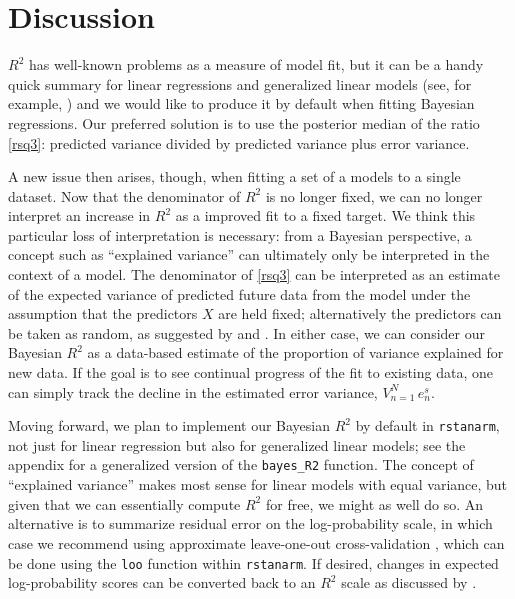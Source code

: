 \documentclass[11pt]{article}
\begin{document}
\section{Discussion}
$R^2$ has well-known problems as a measure of model fit, but it can be a handy
quick summary for linear regressions and generalized linear models (see, for
example, \cite{HuPaltaShao2006}) and we would like to produce it by default
when fitting Bayesian regressions.  Our preferred solution is to use the
posterior median of the ratio \eqref{rsq3}:  predicted variance divided by
predicted variance plus error variance.

A new issue then arises, though, when fitting a set of a models to a single
dataset.  Now that the denominator of $R^2$ is no longer fixed, we can no longer
interpret an increase in $R^2$ as a improved fit to a fixed target.  We think
this particular loss of interpretation is necessary:  from a Bayesian
perspective, a concept such as ``explained variance'' can ultimately only be
interpreted in the context of a model.  The denominator of \eqref{rsq3} can be
interpreted as an estimate of the expected variance of predicted future data
from the model under the assumption that the predictors $X$ are held fixed;
alternatively the predictors can be taken as random, as suggested by
\cite{Helland1987} and \cite{Tjur2009}.  In either case, we can consider our
Bayesian $R^2$ as a data-based estimate of the proportion of variance explained
for new data. If the goal is to see continual progress of the fit to existing
data, one can simply track the decline in the estimated error variance,
$V_{n=1}^N \,e_n^s$.

Moving forward, we plan to implement our Bayesian $R^2$ by default in
{\tt rstanarm}, not just for linear regression but also for generalized linear
models; see the appendix for a generalized version of the
\verb#bayes_R2# function. The concept of ``explained variance'' makes most
sense for linear models with equal variance, but given that we can essentially
compute $R^2$ for free, we might as well do so.  An alternative is to summarize
residual error on the log-probability scale, in which case we recommend using
approximate leave-one-out cross-validation \citep{VehtariGelmanGabry2017},
which can be done using the {\tt loo} function within {\tt rstanarm}.
If desired, changes in expected log-probability scores can be converted back to
an $R^2$ scale as discussed by \cite{Nagelkerke1991}.
\end{document}
